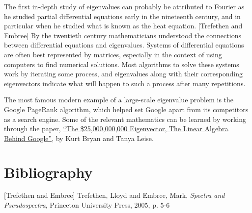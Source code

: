 \documentclass{ximera}
\begin{document}
\begin{remark}
The first in-depth study of eigenvalues can probably be attributed to Fourier as he studied partial differential equations early in the nineteenth century, and in particular when he studied what is known as the heat equation. [Trefethen and  Embree]  By the twentieth century mathematicians understood the connections between differential equations and eigenvalues. Systems of differential equations are often best represented by matrices, especially in the context of using computers to find numerical solutions. Most algorithms to solve these systems work by iterating some process, and eigenvalues along with their corresponding eigenvectors indicate what will happen to such a process after many repetitions.
    
The most famous modern example of a large-scale eigenvalue problem is the Google PageRank algorithm, which helped set Google apart from its competitors as a search engine.  Some of the relevant mathematics can be learned by working through the paper, \href{https://doi.org/10.1137/050623280}{``The \$25,000,000,000 Eigenvector, The Linear Algebra Behind Google''}, by Kurt Bryan and Tanya Leise. 
\end{remark}

    
\section*{Bibliography}
[Trefethen and  Embree] Trefethen, Lloyd and Embree, Mark, {\it Spectra and Pseudospectra}, Princeton University Press, 2005, p. 5-6
\end{document}
